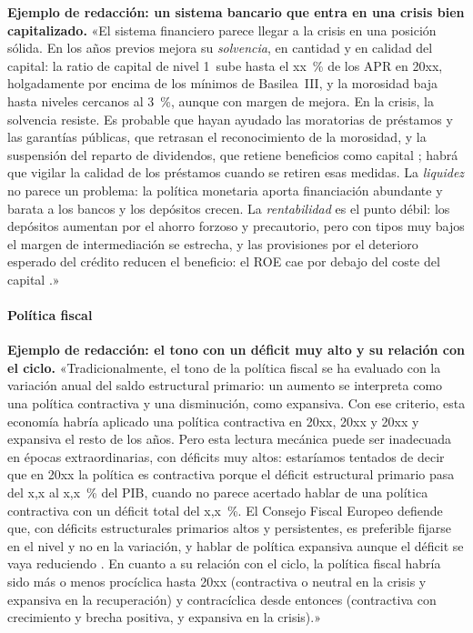 \documentclass[11pt]{article}
\begin{document}
\begin{anotaciones}
\textbf{Ejemplo de redacción: un sistema bancario que entra en una crisis bien capitalizado.}
«El sistema financiero parece llegar a la crisis en una posición sólida. En los años previos mejora su \emph{solvencia}, en cantidad y en calidad del capital: la ratio de capital de nivel 1~sube hasta el xx~\% de los APR en 20xx, holgadamente por encima de los mínimos de Basilea~III, y la morosidad baja hasta niveles cercanos al 3~\%, aunque con margen de mejora. En la crisis, la solvencia resiste. Es probable que hayan ayudado las moratorias de préstamos y las garantías públicas, que retrasan el reconocimiento de la morosidad, y la suspensión del reparto de dividendos, que retiene beneficios como capital \parencite{BCE2020Dividendos,ABE2020Moratorias}; habrá que vigilar la calidad de los préstamos cuando se retiren esas medidas. La \emph{liquidez} no parece un problema: la política monetaria aporta financiación abundante y barata a los bancos y los depósitos crecen. La \emph{rentabilidad} es el punto débil: los depósitos aumentan por el ahorro forzoso y precautorio, pero con tipos muy bajos el margen de intermediación se estrecha, y las provisiones por el deterioro esperado del crédito reducen el beneficio: el ROE cae por debajo del coste del capital \parencite{BCE2020IEF}.»
\end{anotaciones}

\paragraph{Política fiscal}
\begin{anotaciones}
\textbf{Ejemplo de redacción: el tono con un déficit muy alto y su relación con el ciclo.}
«Tradicionalmente, el tono de la política fiscal se ha evaluado con la variación anual del saldo estructural primario: un aumento se interpreta como una política contractiva y una disminución, como expansiva. Con ese criterio, esta economía habría aplicado una política contractiva en 20xx, 20xx y 20xx y expansiva el resto de los años. Pero esta lectura mecánica puede ser inadecuada en épocas extraordinarias, con déficits muy altos: estaríamos tentados de decir que en 20xx la política es contractiva porque el déficit estructural primario pasa del x,x al x,x~\% del PIB, cuando no parece acertado hablar de una política contractiva con un déficit total del x,x~\%. El Consejo Fiscal Europeo defiende que, con déficits estructurales primarios altos y persistentes, es preferible fijarse en el nivel y no en la variación, y hablar de política expansiva aunque el déficit se vaya reduciendo \parencite{EFB2021FiscalStance}. En cuanto a su relación con el ciclo, la política fiscal habría sido más o menos procíclica hasta 20xx (contractiva o neutral en la crisis y expansiva en la recuperación) y contracíclica desde entonces (contractiva con crecimiento y brecha positiva, y expansiva en la crisis).»
\end{anotaciones}
\end{document}
